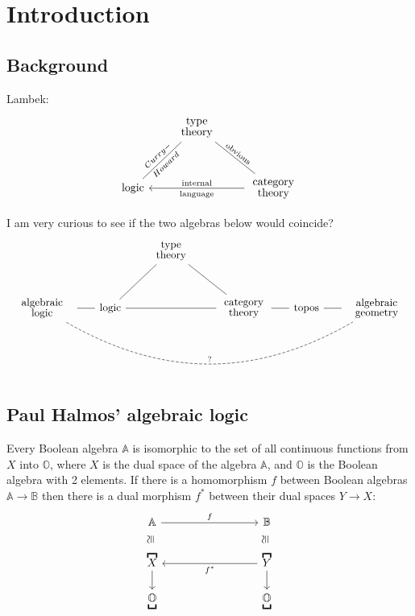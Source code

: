 \chapter{Introduction}\label{chap:introduction}

\section{Background}

Lambek:
\begin{equation}
\begin{tikzcd}[row sep=1cm, column sep=0.6cm]
& \parbox{1.5cm}{\linespread{-0.5}\selectfont\centering type theory} \arrow[dl,dash,"Curry-","Howard"',sloped] \arrow[dr,dash,"\text{obvious}",sloped] & \\
\mbox{logic} & {} & \parbox{1.5cm}{\linespread{-0.5}\selectfont\centering category theory} \arrow[ll,"\text{internal}"',"\text{language}"]
\end{tikzcd}
\end{equation}

I am very curious to see if the two algebras below would coincide?
\begin{equation}
\begin{tikzcd}[row sep=1cm, column sep=0.6cm]
 & & \parbox{1.5cm}{\linespread{-0.5}\selectfont\centering type theory} \arrow[dl,dash] \arrow[dr,dash] & & & \\
\parbox{2cm}{\linespread{-0.5}\selectfont\centering algebraic logic} \arrow[rrrrr, dashed, dash, bend right,"?"] \arrow[r,dash] & \mbox{logic} \arrow[rr,dash] & {} & \parbox{1.5cm}{\linespread{-0.5}\selectfont\centering category theory} \arrow[r,dash] & \mbox{topos} \arrow[r,dash] & \parbox{2cm}{\linespread{-0.5}\selectfont\centering algebraic geometry}
\end{tikzcd}
\end{equation}

\section{Paul Halmos' algebraic logic}

Every Boolean algebra $\mathbb{A}$ is isomorphic to the set of all continuous functions from $X$ into $\mathbb{O}$, where $X$ is the dual space of the algebra $\mathbb{A}$, and $\mathbb{O}$ is the Boolean algebra with 2 elements.  If there is a homomorphism $f$ between Boolean algebras $\mathbb{A} \rightarrow \mathbb{B}$ then there is a dual morphism $f^*$ between their dual spaces $Y \rightarrow X$:
\begin{equation}
\begin{tikzcd}[column sep=3cm, row sep=0.6cm]
\mathbb{A} \arrow[r,"f"] \arrow[d,shift left=2,phantom,"\cong"{anchor=south,rotate=90}] & \mathbb{B} \arrow[d,shift left=2,phantom,"\cong"{anchor=south,rotate=90}] \\
\overbracket{X} \arrow[d] & \overbracket{Y} \arrow[d] \arrow[l,"f^*"] \\
\underbracket{\mathbb{O}} & \underbracket{\mathbb{O}} 
\end{tikzcd}
\end{equation}


